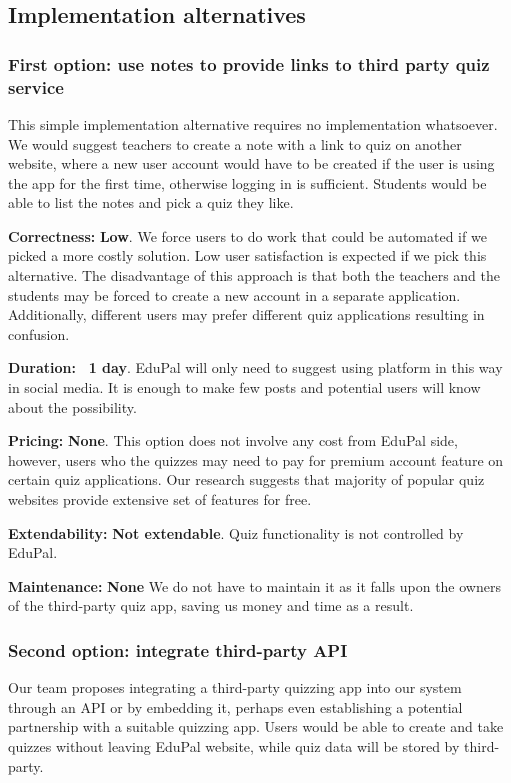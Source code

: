 \documentclass[
    english, %
]{VUMIFPSkursinis}
\begin{document}
\subsection{Implementation alternatives}

\subsubsection{First option: use notes to provide links to third party quiz service}

This simple implementation alternative requires no implementation whatsoever.  We would suggest teachers to create a note with a link to quiz on another website, where a new user account would have to be created if the user is using the app for the first time, otherwise logging in is sufficient. Students would be able to list the notes and pick a quiz they like.

\textbf{Correctness:} \textbf{Low}. We force users to do work that could be automated if we picked a more costly solution. Low user satisfaction is expected if we pick this alternative. The disadvantage of this approach is that both the teachers and the students may be forced to create a new account in a separate application. Additionally, different users may prefer different quiz applications resulting in confusion.

\textbf{Duration:} \textbf{~1 day}. EduPal will only need to suggest using platform in this way in social media. It is enough to make few posts and potential users will know about the possibility.

\textbf{Pricing:} \textbf{None}. This option does not involve any cost from EduPal side, however, users who the quizzes may need to pay for premium account feature on certain quiz applications. Our research suggests that majority of popular quiz websites provide extensive set of features for free.

\textbf{Extendability:} \textbf{Not extendable}. Quiz functionality is not controlled by EduPal.

\textbf{Maintenance:} \textbf{None} We do not have to maintain it as it falls upon the owners of the third-party quiz app, saving us money and time as a result.

\subsubsection{Second option: integrate third-party API}

Our team proposes integrating a third-party quizzing app into our system through an API or by embedding it, perhaps even establishing a potential partnership with a suitable quizzing app. Users would be able to create and take quizzes without leaving EduPal website, while quiz data will be stored by third-party.
\end{document}
